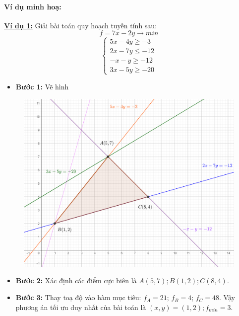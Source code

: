 \documentclass{article}
\begin{document}
\paragraph{Ví dụ minh hoạ:}
\begin{flushleft}
    \hspace{0.4cm} \textbf{\underline{Ví dụ 1:}} Giải bài toán quy hoạch tuyến tính sau:
    \begin{equation*}
        f=7x-2y \longrightarrow min
    \end{equation*}
    \begin{equation*}
        \begin{cases}
            5x - 4y \geq -3 \\
            2x - 7y \leq -12  \\
            -x-y \geq -12 \\
            3x-5y \geq -20
        \end{cases}
    \end{equation*}
\end{flushleft}
\begin{itemize}
    \item \textbf{Bước 1:} Vẽ hình
\end{itemize}
\begin{figure}[ht]
    \centering
    \includegraphics[scale=0.4,frame]{Images/vdhinhhoc.png}
\end{figure}
\begin{itemize}
    \item \textbf{Bước 2:} Xác định các điểm cực biên là $A(5,7); B(1,2); C(8,4)$.
\end{itemize}
\begin{itemize}
    \item \textbf{Bước 3:} Thay toạ độ vào hàm mục tiêu: $f_A = 21$; $f_B = 4$; $f_C=48$. Vậy phương án tối ưu duy nhất của bài toán là $(x,y) = (1,2); f_{min}=3$.
\end{itemize}
\end{document}
